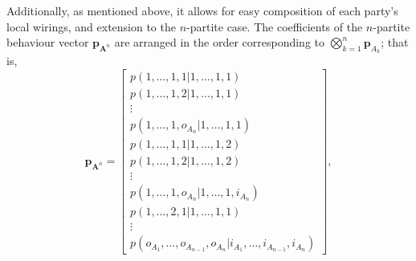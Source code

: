 \documentclass[10pt, a4paper]{article}
\numberwithin{equation}{section} %
\theoremstyle{definition}
\theoremstyle{plain}
\newcommand{\?}{\mathrel{?}} %
\newcommand{\cvec}[1]{\boldsymbol{\mathbf{#1}}}    %
\begin{document}
                  Additionally, as mentioned above, it allows for easy composition of each party's local wirings, and extension to the \(n\)-partite case. The coefficients of the \(n\)-partite behaviour vector \(\cvec{p}_{\cvec{A}^n}\) are arranged in the order corresponding to \(\bigotimes_{k=1}^n \cvec{p}_{A_k}\); that is,
                  \begin{equation}
                    \cvec{p}_{\cvec{A}^n} = \begin{bmatrix}
                                              p(1,\ldots,1,1|1,\ldots,1,1) \\
                                              p(1,\ldots,1,2|1,\ldots,1,1) \\
                                              \vdots \\
                                              p(1,\ldots,1,o_{A_n}|1,\ldots,1,1) \\
                                              p(1,\ldots,1,1|1,\ldots,1,2) \\
                                              p(1,\ldots,1,2|1,\ldots,1,2) \\
                                              \vdots \\
                                              p(1,\ldots,1,o_{A_n}|1,\ldots,1,i_{A_n}) \\
                                              p(1,\ldots,2,1|1,\ldots,1,1) \\
                                              \vdots \\
                                              p(o_{A_1},\ldots,o_{A_{n-1}},o_{A_n}|i_{A_1},\ldots,i_{A_{n-1}},i_{A_n})
                                            \end{bmatrix},
                  \end{equation}
\end{document}
